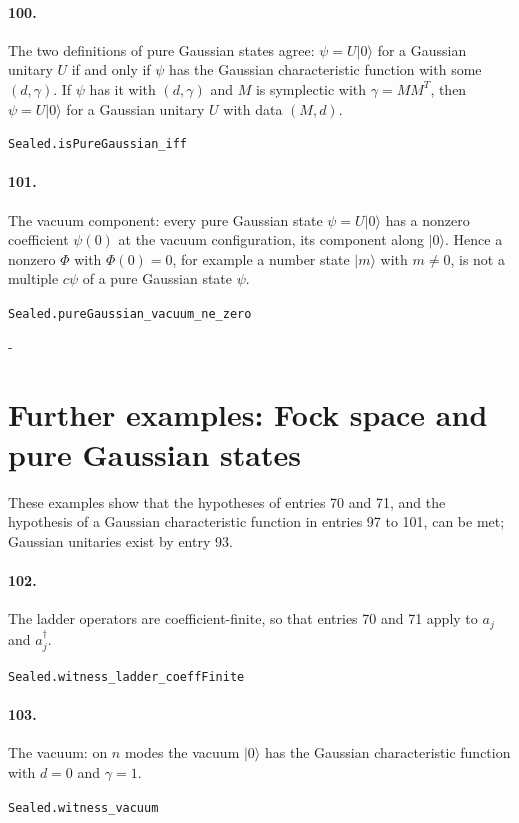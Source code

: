 \documentclass[11pt]{article}
\makeatletter
\newcommand{\keepspace}[1]{\par\penalty-100\begingroup\setlength{\dimen@}{#1}\dimen@ii\pagegoal\advance\dimen@ii-\pagetotal\ifdim\dimen@>\dimen@ii\ifdim\dimen@ii>\z@\vfil\fi\break\fi\endgroup}
\makeatother
\begin{document}
\paragraph{100.} The two definitions of pure Gaussian states agree: $\psi = U|0\rangle$ for a Gaussian unitary $U$ if and only if $\psi$ has the Gaussian characteristic function with some $(d, \gamma)$. If $\psi$ has it with $(d, \gamma)$ and $M$ is symplectic with $\gamma = M M^T$, then $\psi = U|0\rangle$ for a Gaussian unitary $U$ with data $(M, d)$.\par{\footnotesize\texttt{Sealed.isPureGaussian\_iff}}

\paragraph{101.} The vacuum component: every pure Gaussian state $\psi = U|0\rangle$ has a nonzero coefficient $\psi(0)$ at the vacuum configuration, its component along $|0\rangle$. Hence a nonzero $\Phi$ with $\Phi(0) = 0$, for example a number state $|m\rangle$ with $m \ne 0$, is not a multiple $c\psi$ of a pure Gaussian state $\psi$.\par{\footnotesize\texttt{Sealed.pureGaussian\_vacuum\_ne\_zero}}

\keepspace{14\baselineskip}\section*{Further examples: Fock space and pure Gaussian states}
These examples show that the hypotheses of entries 70 and 71, and the hypothesis of a Gaussian characteristic function in entries 97 to 101, can be met; Gaussian unitaries exist by entry 93.

\paragraph{102.} The ladder operators are coefficient-finite, so that entries 70 and 71 apply to $a_j$ and $a_j^\dagger$.\par{\footnotesize\texttt{Sealed.witness\_ladder\_coeffFinite}}

\paragraph{103.} The vacuum: on $n$ modes the vacuum $|0\rangle$ has the Gaussian characteristic function with $d = 0$ and $\gamma = 1$.\par{\footnotesize\texttt{Sealed.witness\_vacuum}}
\end{document}
